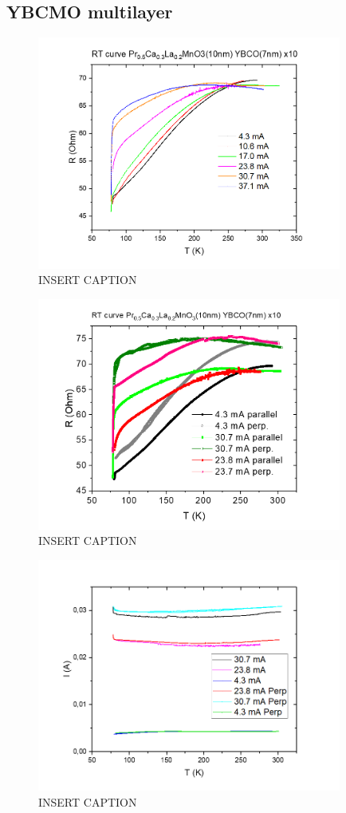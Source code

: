 \documentclass{comjnl}
\begin{document}
\subsection{YBCMO multilayer}
\begin{figure}[h]
\centering
\includegraphics[width=100mm]{Bilde1.png}
\caption{INSERT CAPTION \label{fig:MOI}}
\end{figure}

\begin{figure}[h]
\centering
\includegraphics[width=100mm]{Bilde2.png}
\caption{INSERT CAPTION \label{fig:MOI}}
\end{figure}

\begin{figure}[h]
\centering
\includegraphics[width=100mm]{Bilde3.png}
\caption{INSERT CAPTION \label{fig:MOI}}
\end{figure}
\end{document}

